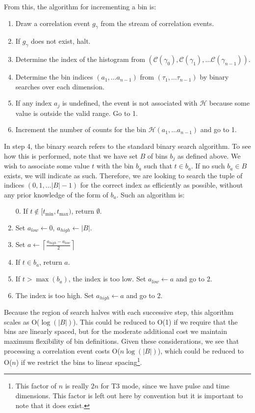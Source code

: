 \documentclass{article}
\newcommand{\abs}[1]{\ensuremath{\left|#1\right|}}
\newcommand{\Channel}{\ensuremath{\mathcal{C}}}
\newcommand{\photon}{\ensuremath{\gamma}}
\newcommand{\Histogram}{\ensuremath{\mathcal{H}}}
\newcommand{\ceil}[1]{\ensuremath{\left\lceil #1\right\rceil}}
\begin{document}
From this, the algorithm for incrementing a bin is:
\begin{enumerate}
\item Draw a correlation event $g_{\photon}$ from the stream of correlation events. 
\item If $g_{\photon}$ does not exist, halt.
\item Determine the index of the histogram from $(\Channel(\photon_{0}), \Channel(\photon_{1}),\ldots\Channel(\photon_{n-1}))$.
\item Determine the bin indices $(a_{1},\ldots a_{n-1})$ from $(\tau_{1},\ldots\tau_{n-1})$ by binary searches over each dimension.
\item If any index $a_{j}$ is undefined, the event is not associated with \Histogram{} because some value is outside the valid range. Go to 1.
\item Increment the number of counts for the bin $\Histogram(a_{1},\ldots a_{n-1})$ and go to 1.
\end{enumerate}
In step 4, the binary search refers to the standard binary search algorithm. To see how this is performed, note that we have set $B$ of bins $b_{j}$ as defined above. We wish to associate some value $t$ with the bin $b_{a}$ such that $t\in b_{a}$. If no such $b_{a}\in B$ exists, we will indicate as such. Therefore, we are looking to search the tuple of indices $(0,1,\ldots \abs{B}-1)$ for the correct index as efficiently as possible, without any prior knowledge of the form of $b_{a}$. Such an algorithm is:
\begin{enumerate}
\item[0.] If $t\not\in[t_{\min},t_{\max})$, return $\emptyset$.
\item Set $a_{low}\leftarrow 0$, $a_{high}\leftarrow\abs{B}$.
\item Set $a\leftarrow\ceil{\frac{a_{high}-a_{low}}{2}}$
\item If $t\in b_{a}$, return $a$.
\item If $t>\max(b_{a})$, the index is too low. Set $a_{low}\leftarrow a$ and go to 2.
\item The index is too high. Set $a_{high}\leftarrow a$ and go to 2.
\end{enumerate}
Because the region of search halves with each successive step, this algorithm scales as O($\log(\abs{B})$). This could be reduced to O(1) if we require that the bins are linearly spaced, but for the moderate additional cost we maintain maximum flexibility of bin definitions. Given these considerations, we see that processing a correlation event costs O($n\log(\abs{B})$), which could be reduced to O($n$) if we restrict the bins to linear spacing\footnote{This factor of $n$ is really $2n$ for T3 mode, since we have pulse and time dimensions. This factor is left out here by convention but it is important to note that it does exist.}.
\end{document}
